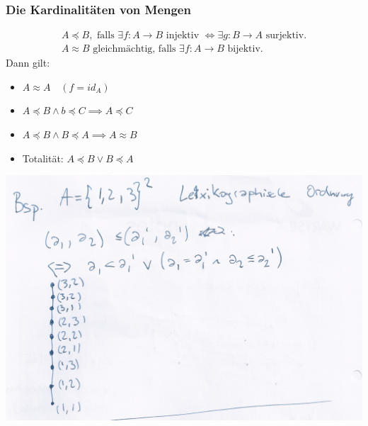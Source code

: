 \subsubsection{Die Kardinalitäten von Mengen}
\begin{def*}[note = Gleichmächtig , index = Gleichmächtig]
	\begin{gather*}
		A \preceq B, \text{ falls } \exists f : A \rightarrow B \text{ injektiv } \iff \exists g : B \rightarrow A \text{ surjektiv}. \\
		A \approx B \text{ gleichmächtig, falls } \exists f : A \rightarrow B \text{ bijektiv}.
	\end{gather*}
	Dann gilt:
	\begin{itemize}
		\item $A \approx A \quad (f = id_A)$
		\item $A \preceq B \wedge b \preceq C \implies A \preceq C$
		\item $A \preceq B \wedge B \preceq A \implies A \approx B$
		\item Totalität: $A \preceq B \vee B \preceq A$
	\end{itemize}
\end{def*}
\begin{bsp*}
	\includegraphics[width=\textwidth]{Bild23}
\end{bsp*}
